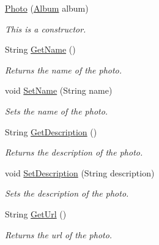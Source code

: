 \begin{DoxyCompactItemize}
\item 
\hyperlink{classcom_1_1shephertz_1_1app42_1_1paas_1_1sdk_1_1csharp_1_1gallery_1_1_album_1_1_photo_aaf42caef21725cf6561f03675b80397c}{Photo} (\hyperlink{classcom_1_1shephertz_1_1app42_1_1paas_1_1sdk_1_1csharp_1_1gallery_1_1_album}{Album} album)
\begin{DoxyCompactList}\small\item\em This is a constructor. \end{DoxyCompactList}\item 
String \hyperlink{classcom_1_1shephertz_1_1app42_1_1paas_1_1sdk_1_1csharp_1_1gallery_1_1_album_1_1_photo_a160e7085e7aeab09fa1fc6bbc7376ecc}{Get\+Name} ()
\begin{DoxyCompactList}\small\item\em Returns the name of the photo. \end{DoxyCompactList}\item 
void \hyperlink{classcom_1_1shephertz_1_1app42_1_1paas_1_1sdk_1_1csharp_1_1gallery_1_1_album_1_1_photo_a994f2bdcccf14ee7168521d8fe75a9e3}{Set\+Name} (String name)
\begin{DoxyCompactList}\small\item\em Sets the name of the photo. \end{DoxyCompactList}\item 
String \hyperlink{classcom_1_1shephertz_1_1app42_1_1paas_1_1sdk_1_1csharp_1_1gallery_1_1_album_1_1_photo_a9fe5b47ac0a107362eba6a747a2667c9}{Get\+Description} ()
\begin{DoxyCompactList}\small\item\em Returns the description of the photo. \end{DoxyCompactList}\item 
void \hyperlink{classcom_1_1shephertz_1_1app42_1_1paas_1_1sdk_1_1csharp_1_1gallery_1_1_album_1_1_photo_ac4c58bbe232ba50efd1fa9fe1f455d74}{Set\+Description} (String description)
\begin{DoxyCompactList}\small\item\em Sets the description of the photo. \end{DoxyCompactList}\item 
String \hyperlink{classcom_1_1shephertz_1_1app42_1_1paas_1_1sdk_1_1csharp_1_1gallery_1_1_album_1_1_photo_a20dff83b0824ebefb5ce67af84002f7a}{Get\+Url} ()
\begin{DoxyCompactList}\small\item\em Returns the url of the photo. \end{DoxyCompactList}\item 

\end{DoxyCompactItemize}
